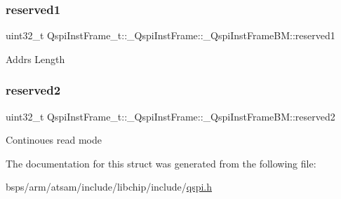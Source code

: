 \subsubsection{\texorpdfstring{reserved1}{reserved1}}
{\footnotesize\ttfamily uint32\+\_\+t Qspi\+Inst\+Frame\+\_\+t\+::\+\_\+\+Qspi\+Inst\+Frame\+::\+\_\+\+Qspi\+Inst\+Frame\+B\+M\+::reserved1}

Addrs Length \mbox{\label{structQspiInstFrame__t_1_1__QspiInstFrame_1_1__QspiInstFrameBM_a39bfa8c151943973f91f3ee7a342b721}} 
\subsubsection{\texorpdfstring{reserved2}{reserved2}}
{\footnotesize\ttfamily uint32\+\_\+t Qspi\+Inst\+Frame\+\_\+t\+::\+\_\+\+Qspi\+Inst\+Frame\+::\+\_\+\+Qspi\+Inst\+Frame\+B\+M\+::reserved2}

Continoues read mode 

The documentation for this struct was generated from the following file\+:\begin{DoxyCompactItemize}
\item 
bsps/arm/atsam/include/libchip/include/\mbox{\hyperlink{qspi_8h}{qspi.\+h}}\end{DoxyCompactItemize}
